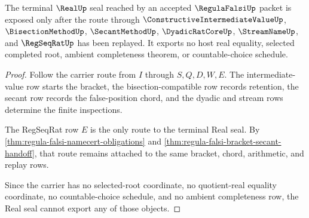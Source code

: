 \begin{theorem}
\label{thm:regula-falsi-real-seal-nonescape}
The terminal $\RealUp$ seal reached by an accepted $\RegulaFalsiUp$ packet is exposed only after the route through $\ConstructiveIntermediateValueUp$, $\BisectionMethodUp$, $\SecantMethodUp$, $\DyadicRatCoreUp$, $\StreamNameUp$, and $\RegSeqRatUp$ has been replayed. It exports no host real equality, selected completed root, ambient completeness theorem, or countable-choice schedule.
\end{theorem}
\begin{proof}
Follow the carrier route from $I$ through $S,Q,D,W,E$. The intermediate-value row starts the bracket, the bisection-compatible row records retention, the secant row records the false-position chord, and the dyadic and stream rows determine the finite inspections.

The RegSeqRat row $E$ is the only route to the terminal Real seal. By \autoref{thm:regula-falsi-namecert-obligations} and \autoref{thm:regula-falsi-bracket-secant-handoff}, that route remains attached to the same bracket, chord, arithmetic, and replay rows.

Since the carrier has no selected-root coordinate, no quotient-real equality coordinate, no countable-choice schedule, and no ambient completeness row, the Real seal cannot export any of those objects.
\end{proof}



